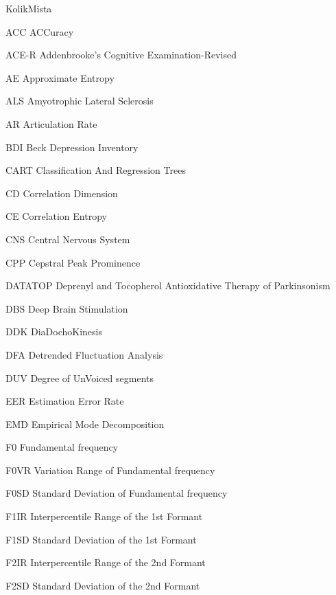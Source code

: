 \begin{seznamzkratek}{KolikMista}

		{ACC}
		{ACCuracy}

		{ACE-R}
		{Addenbrooke's Cognitive Examination-Revised}

		{AE}
		{Approximate Entropy}

		{ALS}
		{Amyotrophic Lateral Sclerosis}

		{AR}
		{Articulation Rate}

		{BDI}
		{Beck Depression Inventory}

		{CART}
		{Classification And Regression Trees}

		{CD}
		{Correlation Dimension}

		{CE}
		{Correlation Entropy}

		{CNS}
		{Central Nervous System}

		{CPP}
		{Cepstral Peak Prominence}

		{DATATOP}
		{Deprenyl and Tocopherol Antioxidative Therapy of Parkinsonism}

		{DBS}
		{Deep Brain Stimulation}

		{DDK}
		{DiaDochoKinesis}

		{DFA}
		{Detrended Fluctuation Analysis}

		{DUV}
		{Degree of UnVoiced segments}

		{EER}
		{Estimation Error Rate}

		{EMD}
		{Empirical Mode Decomposition}

		{F0}
		{Fundamental frequency}

		{F0VR}
		{Variation Range of Fundamental frequency}

		{F0SD}
		{Standard Deviation of Fundamental frequency}

		{F1IR}
		{Interpercentile Range of the 1st Formant}

		{F1SD}
		{Standard Deviation of the 1st Formant}

		{F2IR}
		{Interpercentile Range of the 2nd Formant}

		{F2SD}
		{Standard Deviation of the 2nd Formant}


\end{seznamzkratek}
